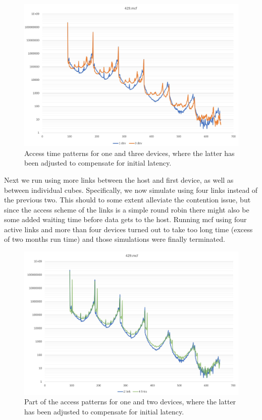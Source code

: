 \begin{figure}[!ht]
    \centering
    \includegraphics[width=1.0\linewidth]{figure/429-x_4-2.jpg}
    \caption{Access time patterns for one and three devices, where the latter has been adjusted to compensate for initial latency.}
    \label{Memory-access-429-double}
\end{figure}

Next we run using more links between the host and first device, as well as between individual cubes. Specifically, we now simulate using four links instead of the previous two. This should to some extent alleviate the contention issue, but since the access scheme of the links is a simple round robin there might also be some added waiting time before data gets to the host. Running mcf using four active links and more than four devices turned out to take too long time (excess of two months run time) and those simulations were finally terminated.
\bigskip

\begin{figure}[!ht]
    \centering
    \includegraphics[width=1.0\linewidth]{figure/429-2_4-8.jpg}
    \caption{Part of the access patterns for one and two devices, where the latter has been adjusted to compensate for initial latency.}
    \label{Memory-access-429-link-compare}
\end{figure}

